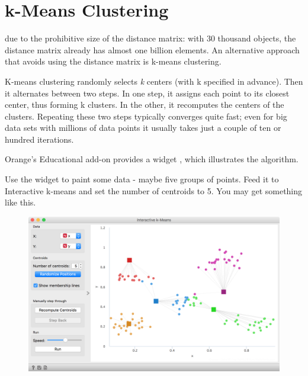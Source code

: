 \chapter{k-Means Clustering}
\label{ch:kmeans-clustering}

 due to the prohibitive size of the distance matrix: with 30 thousand objects, the distance matrix already has almost one billion elements. An alternative approach that avoids using the distance matrix is k-means clustering.

K-means clustering randomly selects \textit{k} centers (with k specified in advance). Then it alternates between two steps. In one step, it assigns each point to its closest center, thus forming k clusters. In the other, it recomputes the centers of the clusters. Repeating these two steps typically converges quite fast; even for big data sets with millions of data points it usually takes just a couple of ten or hundred iterations.

Orange's Educational add-on provides a widget , which illustrates the algorithm.

Use the  widget to paint some data - maybe five groups of points. Feed it to Interactive k-means and set the number of centroids to 5. You may get something like this.


\begin{figure}[h]
    \centering
    \includegraphics[width=\linewidth]{interactive-kmeans.png}
    \caption{$\;$} %
\end{figure}


